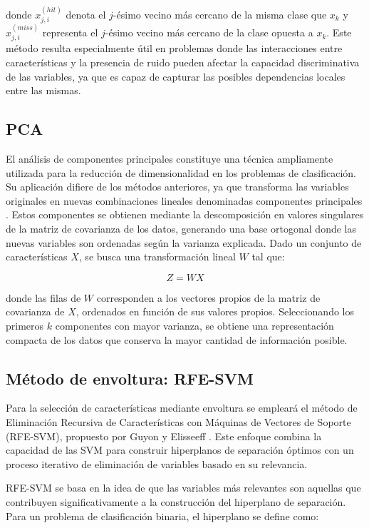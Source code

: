 \documentclass[a4paper,12pt]{article}
\begin{document}
\noindent
donde \(x_{j,i}^{(hit)}\) denota el \(j\)-ésimo vecino más cercano de la misma clase que \(x_k\) y \(x_{j,i}^{(miss)}\) representa el \(j\)-ésimo vecino más cercano de la clase opuesta a \(x_k\). Este método resulta especialmente útil en problemas donde las interacciones entre características y la presencia de ruido pueden afectar la capacidad discriminativa de las variables, ya que es capaz de capturar las posibles dependencias locales entre las mismas.

\subsection{PCA}

El análisis de componentes principales constituye una técnica ampliamente utilizada para la reducción de dimensionalidad en los problemas de clasificación. Su aplicación difiere de los métodos anteriores, ya que transforma las variables originales en nuevas combinaciones lineales denominadas componentes principales \cite{jolliffe2002}. Estos componentes se obtienen mediante la descomposición en valores singulares de la matriz de covarianza de los datos, generando una base ortogonal donde las nuevas variables son ordenadas según la varianza explicada. Dado un conjunto de características \( X \), se busca una transformación lineal \( W \) tal que:

\[
    Z = WX
\]

\noindent donde las filas de \( W \) corresponden a los vectores propios de la matriz de covarianza de \( X \), ordenados en función de sus valores propios. Seleccionando los primeros \( k \) componentes con mayor varianza, se obtiene una representación compacta de los datos que conserva la mayor cantidad de información posible.

\subsection{Método de envoltura: RFE-SVM}

Para la selección de características mediante envoltura se empleará el método de Eliminación Recursiva de Características con Máquinas de Vectores de Soporte (RFE-SVM), propuesto por Guyon y Elisseeff \cite{guyon2003}.  Este enfoque combina la capacidad de las SVM para construir hiperplanos de separación óptimos con un proceso iterativo de eliminación de variables basado en su relevancia.

RFE-SVM se basa en la idea de que las variables más relevantes son aquellas que contribuyen significativamente a la construcción del hiperplano de separación. Para un problema de clasificación binaria, el hiperplano se define como:
\end{document}
